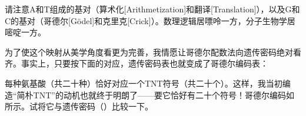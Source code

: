 请注意A和T组成的基对（算术化[Arithmetization]和翻译[Translation]），以及G和C的基对（哥德尔[Gödel]和克里克[Crick]）。数理逻辑居嘌呤一方，分子生物学居嘧啶一方。

为了使这个映射从美学角度看更为完善，我情愿让哥德尔配数法向遗传密码绝对看齐。事实上，只要按下面的对应，遗传密码表也就变成了哥德尔编码表：


每种氨基酸（共二十种）恰好对应一个TNT符号（共二十个）。这样，我当初编造“简朴TNT”的动机也就终于明朗了——要它恰好有二十个符号！哥德尔编码如所示。试将它与遗传密码（）比较一下。

